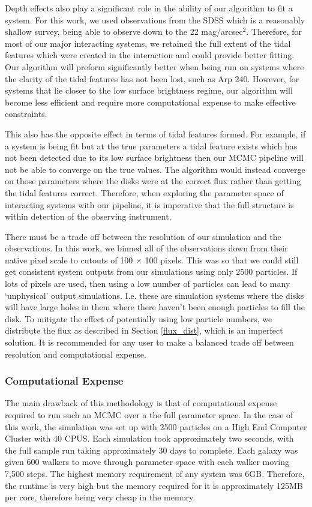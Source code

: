 Depth effects also play a significant role in the ability of our algorithm to fit a system. For this work, we used observations from the SDSS which is a reasonably shallow survey, being able to observe down to the 22 mag/arcsec$^{2}$. Therefore, for most of our major interacting systems, we retained the full extent of the tidal features which were created in the interaction and could provide better fitting. Our algorithm will preform significantly better when being run on systems where the clarity of the tidal features has not been lost, such as Arp 240. However, for systems that lie closer to the low surface brightness regime, our algorithm will become less efficient and require more computational expense to make effective constraints.

This also has the opposite effect in terms of tidal features formed. For example, if a system is being fit but at the true parameters a tidal feature exists which has not been detected due to its low surface brightness then our MCMC pipeline will not be able to converge on the true values. The algorithm would instead converge on those parameters where the disks were at the correct flux rather than getting the tidal features correct. Therefore, when exploring the parameter space of interacting systems with our pipeline, it is imperative that the full structure is within detection of the observing instrument.

There must be a trade off between the resolution of our simulation and the observations. In this work, we binned all of the observations down from their native pixel scale to cutouts of 100 $\times$ 100 pixels. This was so that we could still get consistent system outputs from our simulations using only 2500 particles. If lots of pixels are used, then using a low number of particles can lead to many `unphysical' output simulations. I.e. these are simulation systems where the disks will have large holes in them where there haven't been enough particles to fill the disk. To mitigate the effect of potentially using low particle numbers, we distribute the flux as described in Section \ref{flux_dist}, which is an imperfect solution. It is recommended for any user to make a balanced trade off between resolution and computational expense.

\subsubsection{Computational Expense}\label{computational_expense}
\noindent The main drawback of this methodology is that of computational expense required to run such an MCMC over a the full parameter space. In the case of this work, the simulation was set up with 2500 particles on a High End Computer Cluster with 40 CPUS. Each simulation took approximately two seconds, with the full sample run taking approximately 30 days to complete. Each galaxy was given 600 walkers to move through parameter space with each walker moving 7,500 steps. The highest memory requirement of any system was 6GB. Therefore, the runtime is very high but the memory required for it is approximately 125MB per core, therefore being very cheap in the memory.

